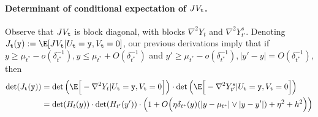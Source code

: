 \documentclass{article}
\begin{document}
	\paragraph{Determinant of conditional expectation of $JV_{{\tt t}}$.} Observe that $JV_{\tt t}$ is block diagonal, with blocks $\nabla^2Y_{t}$ and $\nabla^2 Y_{t'}^s$. Denoting $J_{{\tt t}}({\tt y}) := \E[JV_{{\tt t}}|U_{\tt t} = {\tt y}, V_{\tt t} = 0]$, our previous derivations imply that if $y \geq \mu_{t^*} - o(\delta_{t^*}^{-1}), y \leq \mu_{t^*} + O(\delta_{t^*}^{-1})$ and $y' \geq \mu_{t^*} - o(\delta_{t^*}^{-1}), |y' - y| = O(\delta_{t^*}^{-1})$, then
	\begin{align}
		\det(J_{\tt t}({\tt y})) 
		& = \det\Big(\E\Big[-\nabla^2 Y_t|U_{\tt t} = {\tt y}, V_{\tt t} = 0\Big]\Big) \cdot \det\Big(\E\Big[-\nabla^2 Y_{t'}^s|U_{\tt t} = {\tt y}, V_{\tt t} = 0\Big]\Big) \nonumber \\
		& = \det(H_t(y)) \cdot \det(H_{t'}(y')) \cdot \Big(1 + O\Big(\eta \delta_{t^*}(y)(|y - \mu_{t^*}| \vee |y - y'|) + \eta^2 + h^2\Big)\Big) \label{eqn:randomized-kac-rice-det-jacobian}
	\end{align}
	
\end{document}
